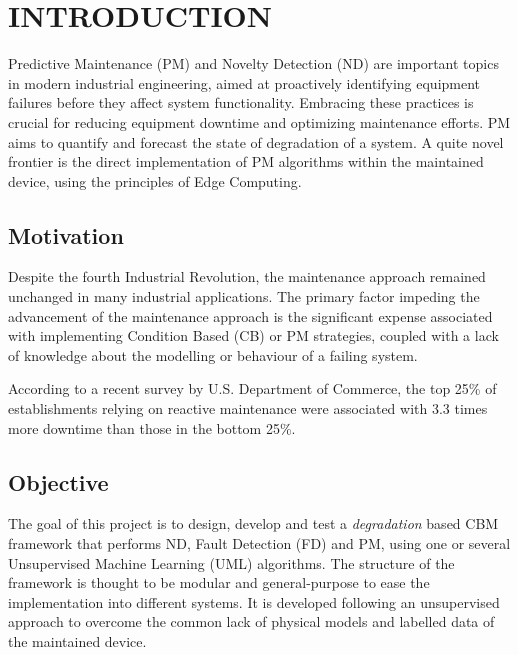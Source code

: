 \section{INTRODUCTION}
\label{sec:introduction}

Predictive Maintenance (PM) and Novelty Detection (ND) are important topics in modern industrial engineering, aimed at proactively identifying equipment failures before they affect system functionality. Embracing these practices is crucial for reducing equipment downtime and optimizing maintenance efforts. PM aims to quantify and forecast the state of degradation of a system. A quite novel frontier is the direct implementation of PM algorithms within the maintained device, using the principles of Edge Computing.

\subsection{Motivation}
Despite the fourth Industrial Revolution, the maintenance approach remained unchanged in many industrial applications. The primary factor impeding the advancement of the maintenance approach is the significant expense associated with implementing Condition Based (CB) or PM strategies, coupled with a lack of knowledge about the modelling or behaviour of a failing system.

According to a recent survey by U.S. Department of Commerce, the top 25\% of establishments relying on reactive maintenance
were associated with 3.3 times more downtime than those in the bottom 25\%. 

\subsection{Objective}
The goal of this project is to design, develop and test a \emph{degradation} based CBM framework
that performs ND, Fault Detection (FD) and PM, using one or several Unsupervised Machine Learning (UML) algorithms. 
The structure of the framework is thought to be modular and general-purpose to ease the implementation into different systems. It is developed following an unsupervised approach to overcome the common lack of physical models and labelled data of the maintained device. 